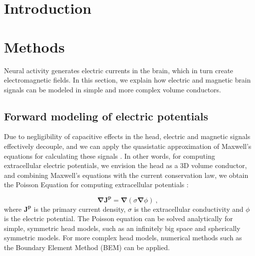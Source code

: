 \documentclass[preprint,10pt,authoryear]{elsarticle}
\begin{document}
\linenumbers


\section{Introduction}\label{sec:introduction}

\section{Methods}\label{sec:methods}
Neural activity generates electric currents in the brain, which in turn create electromagnetic fields. In this section, we explain how electric and magnetic brain signals can be modeled in simple and more complex volume conductors.

\subsection{Forward modeling of electric potentials}
Due to negligibility of capacitive effects in the head, electric and magnetic signals effectively decouple, and we can apply the quasistatic approximation of Maxwell's equations for calculating these signals \citep{HAMALAINEN1993,NUNEZ2006}. In other words, for computing extracellular electric potentials, we envision the head as a 3D volume conductor, and combining Maxwell's equations with the current conservation law, we obtain the Poisson Equation for computing extracellular potentials \cite{GRIFFITHS1999}:


\begin{equation} \label{eq:poisson}
\mathbf{\nabla} \mathbf{J^p} = \mathbf{\nabla} (\sigma \mathbf{\nabla} \phi)~,
\end{equation}
where $\mathbf{J^p}$ is the primary current density, $\sigma$ is the extracellular conductivity and $\phi$ is the electric potential. The Poisson equation can be solved analytically for simple, symmetric head models, such as an infinitely big space and spherically symmetric models. For more complex head models, numerical methods such as the Boundary Element Method (BEM) can be applied.
\end{document}
